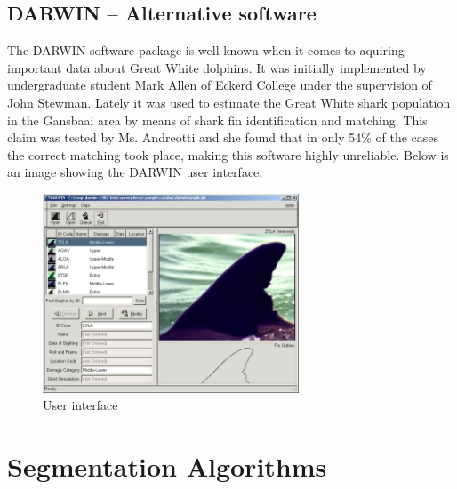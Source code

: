 \documentclass[a4paper,10pt]{article}
\begin{document}
\subsection{DARWIN -- Alternative software}
The DARWIN\cite{Darwin} software package is well known when it comes to aquiring important data about Great White dolphins.  It was initially implemented by undergraduate 
student Mark Allen of Eckerd College under the supervision of John Stewman.  Lately it was used to estimate the Great White
shark population in the Gansbaai area by means of shark fin identification and matching.  This claim was tested by Ms. Andreotti and she found that in only
54\% of the cases the correct matching took place, making this software highly
unreliable.  Below is an image showing the DARWIN user interface. 

\begin{figure}[H]
 \centering
 \includegraphics[width=3in]{Darwin.jpg}
 \caption{User interface}
\end{figure}

\section{Segmentation Algorithms}
\end{document}
